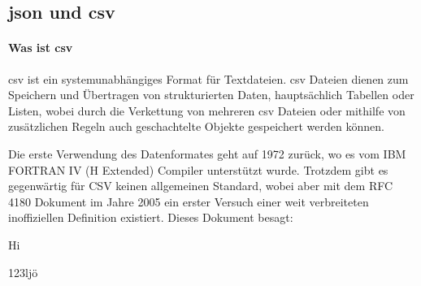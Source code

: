 \subsection{\acs{json} und \acs{csv}}
\paragraph{Was ist \acs{csv}}
\acf{csv} ist ein systemunabhängiges Format für Textdateien. \acs{csv} Dateien dienen zum Speichern und Übertragen von strukturierten Daten, hauptsächlich Tabellen oder Listen, wobei durch die Verkettung von mehreren \acs{csv} Dateien oder mithilfe von zusätzlichen Regeln auch geschachtelte Objekte gespeichert werden können. 

Die erste Verwendung des Datenformates geht auf 1972 zurück, wo es vom IBM FORTRAN IV (H Extended) Compiler unterstützt wurde. Trotzdem gibt es gegenwärtig für CSV keinen allgemeinen Standard, wobei aber mit dem RFC 4180 Dokument im Jahre 2005 ein erster Versuch einer weit verbreiteten inoffiziellen Definition existiert. Dieses Dokument besagt:
\begin{list}{}{}
	\item Hi
	\item 123ljö
\end{list}
